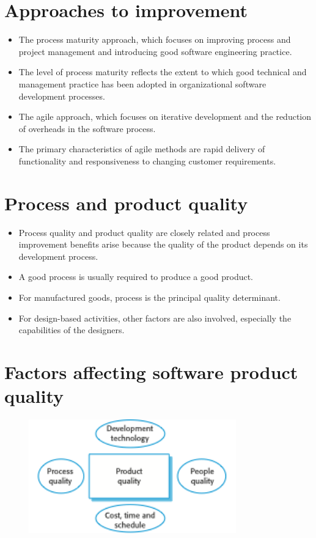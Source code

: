 \section{Approaches to improvement}
\begin{itemize}
\item The process maturity approach, which focuses on improving process and project management and introducing good software engineering practice.

   \item The level of process maturity reflects the extent to which good technical and management practice has been adopted in organizational software development processes.

\item The agile approach, which focuses on iterative development and the reduction of overheads in the software process.

   \item The primary characteristics of agile methods are rapid delivery of functionality and responsiveness to changing customer requirements.
\end{itemize} \section{Process and product quality}
\begin{itemize}

\item Process quality and product quality are closely
related and process improvement benefits arise because the quality of the product depends on its development process.

\item A good process is usually required to produce a good product.

\item For manufactured goods, process is the principal quality determinant.

\item For design-based activities, other factors are also involved, especially the capabilities of the designers.
\end{itemize}

\section{Factors affecting software product quality}
\begin{figure}[h!]
    \centering
    \includegraphics[width = 0.8\textwidth]{./figures/L9_1.png}
    \caption{}
    \label{fig:L9_1}
\end{figure}


